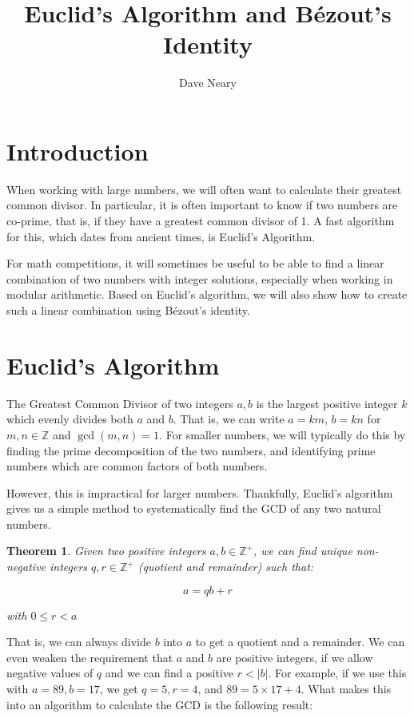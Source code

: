 \documentclass{article}
\newtheorem{theorem}{Theorem}[section]
\begin{document}
\title{Euclid's Algorithm and B\'ezout's Identity}
\author{Dave Neary}

\maketitle

\section{Introduction}

When working with large numbers, we will often want to calculate their greatest common divisor.
In particular, it is often important to know if two numbers are co-prime, that is, if they have a
greatest common divisor of 1. A fast algorithm for this, which dates from ancient times, is
Euclid's Algorithm. 

For math competitions, it will sometimes be useful to be able to find a linear combination of two
numbers with integer solutions, especially when working in modular arithmetic. Based on Euclid's
algorithm, we will also show how to create such a linear combination using B\'ezout's identity.

\section{Euclid's Algorithm}

The Greatest Common Divisor of two integers $a,b$ is the largest positive integer $k$ which 
evenly divides both $a$ and $b$. That is, we can write $a=km$, $b=kn$ for $m,n \in \mathbb{Z}$ and 
$\gcd(m,n) = 1$. For smaller numbers, we will typically do this by finding the prime decomposition
of the two numbers, and identifying prime numbers which are common factors of both numbers.

However, this is impractical for larger numbers. Thankfully, Euclid's algorithm gives us a simple
method to systematically find the GCD of any two natural numbers.

\begin{theorem}
Given two positive integers $a,b \in \mathbb{Z}^+$, we can find unique non-negative integers 
$q,r \in \mathbb{Z}^+$ (quotient and remainder) such that:

\[ a = qb + r \]

with $0\leq r < a$
\end{theorem}

That is, we can always divide $b$ into $a$ to get a quotient and a remainder. We can even weaken the
requirement that $a$ and $b$ are positive integers, if we allow negative values of $q$ and we can find a
positive $r < |b|$. For example, if we use this with $a=89, b=17$, we get $q=5, r=4$, and 
$89 = 5 \times 17 + 4$. What makes this into an algorithm to calculate the GCD is the following result:
\end{document}
